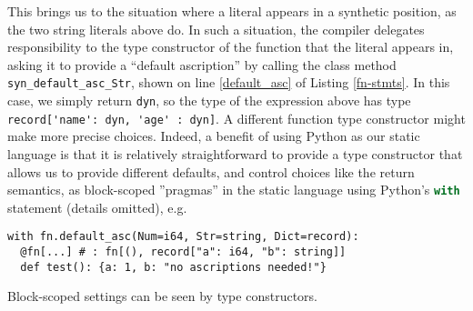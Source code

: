 \documentclass[9pt,preprint]{sigplanconf}
\newcommand{\lstinlinep}[1]{\lstinline[language=Python,basicstyle=\ttfamily\small]{#1}}
\begin{document}
This brings us to the situation where a literal appears in a synthetic position, as the two string literals above do. In such a situation, the compiler delegates responsibility to the type constructor of the function that the literal appears in, asking it to provide a ``default ascription'' by calling the class method \lstinlinep{syn_default_asc_Str}, shown on line \ref{default_asc} of Listing \ref{fn-stmts}. In this case, we simply return \lstinlinep{dyn}, so the type of the expression above has type \lstinline[basicstyle=\ttfamily\small]{record['name': dyn, 'age' : dyn]}. A different function type constructor might make more precise choices. Indeed, a benefit of using Python as our static language is that it is relatively straightforward to provide a type constructor that allows us to provide different defaults, and control choices like the return semantics, as block-scoped ''pragmas'' in the static language using Python's \lstinlinep{with} statement \cite{python} (details omitted), e.g. 
\begin{codelisting}[h]
\begin{lstlisting}[numbers=none]
with fn.default_asc(Num=i64, Str=string, Dict=record):
  @fn[...] # : fn[(), record["a": i64, "b": string]]
  def test(): {a: 1, b: "no ascriptions needed!"} 
\end{lstlisting}
\caption{Block-scoped settings can be seen by type constructors.}
\label{defaultasc}
\end{codelisting}
\vspace{-10px}

\end{document}

